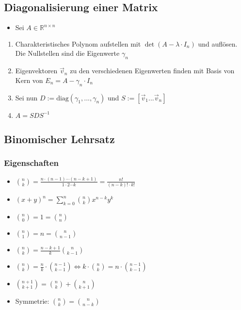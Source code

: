 \documentclass[a3paper, 11pt, landscape]{scrartcl}
\begin{document}
\begin{multicols*}{3}
	\subsection{Diagonalisierung einer Matrix}
	\begin{itemize}
	    \item Sei $A \in \mathbb{R}^{n\times n}$
	    
	\end{itemize}
	\begin{enumerate}
	    \item Charakteristisches Polynom aufstellen mit $\det ( A - \lambda \cdot I_n)$ und auflösen. Die Nullstellen sind die Eigenwerte $\gamma _n$
	    \item Eigenvektoren $\vec{v}_n$ zu den verschiedenen Eigenwerten finden mit Basis von Kern von $E_n = A - \gamma_n \cdot I_n$ 
	    \item Sei nun $D:=\text{diag}(\gamma_1, ...,\gamma_n)$ und $S:=[\vec{v}_1 ... \vec{v}_n]$
	    \item $A=S D S^{-1}$
	\end{enumerate}
	
	
	\subsection{Binomischer Lehrsatz}
	\subsubsection{Eigenschaften}
	\begin{itemize}
	    \item $\binom{n}{k} = \frac{n \cdot (n-1) \dotsm (n-k+1)}{1 \cdot 2 \dotsm k} = \frac{n!}{(n-k)! \cdot{k!}}$
	    \item $(x+y)^n = \sum_{k=0}^{n}\binom{n}{k} x^{n-k}y^{k}$
	    \item $\binom n0 = 1 = \binom nn$
	    \item $\binom n1 = n = \binom n{n-1}$
	    \item $\binom nk = \frac{n-k+1}{k} \binom{n}{k-1}$
	    \item $\binom nk = \frac{n}{k} \cdot \binom{n-1}{k-1} \Leftrightarrow k \cdot \binom nk = n \cdot \binom{n-1}{k-1}$
	    \item $\binom{n+1}{k+1} = \binom nk + \binom n{k+1}$
	    \item Symmetrie: $\binom nk = \binom n{n-k}$
	\end{itemize}

\end{multicols*}
\end{document}
